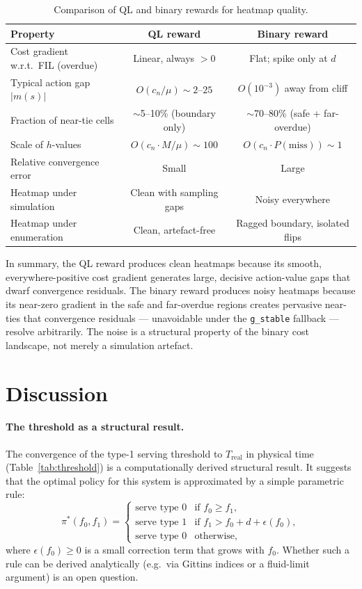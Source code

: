 \documentclass[11pt,a4paper]{article}
\begin{document}
\begin{table}[h]
\centering
\caption{Comparison of QL and binary rewards for heatmap quality.}
\label{tab:compare}
\begin{tabular}{lcc}
\toprule
Property & QL reward & Binary reward \\
\midrule
Cost gradient w.r.t.\ FIL (overdue) & Linear, always $> 0$ & Flat; spike only at $d$ \\
Typical action gap $|m(s)|$ & $O(c_n / \mu) \sim 2$--$25$ & $O(10^{-3})$ away from cliff \\
Fraction of near-tie cells & $\sim$5--10\% (boundary only) & $\sim$70--80\% (safe + far-overdue) \\
Scale of $h$-values & $O(c_n \cdot M / \mu) \sim 100$ & $O(c_n \cdot P(\text{miss})) \sim 1$ \\
Relative convergence error & Small & Large \\
Heatmap under simulation & Clean with sampling gaps & Noisy everywhere \\
Heatmap under enumeration & Clean, artefact-free & Ragged boundary, isolated flips \\
\bottomrule
\end{tabular}
\end{table}

In summary, the QL reward produces clean heatmaps because its smooth,
everywhere-positive cost gradient generates large, decisive action-value gaps
that dwarf convergence residuals.  The binary reward produces noisy heatmaps
because its near-zero gradient in the safe and far-overdue regions creates
pervasive near-ties that convergence residuals --- unavoidable under the
\texttt{g\_stable} fallback --- resolve arbitrarily.  The noise is a structural
property of the binary cost landscape, not merely a simulation artefact.


\section{Discussion}
\label{sec:discussion}

\paragraph{The threshold as a structural result.}
The convergence of the type-1 serving threshold to $T_\text{real}$ in physical
time (Table~\ref{tab:threshold}) is a computationally derived structural result.
It suggests that the optimal policy for this system is approximated by a simple
parametric rule:
\[
  \pi^*(f_0, f_1)
  = \begin{cases}
      \text{serve type 0} & \text{if } f_0 \geq f_1, \\
      \text{serve type 1} & \text{if } f_1 > f_0 + d + \epsilon(f_0), \\
      \text{serve type 0} & \text{otherwise},
    \end{cases}
\]
where $\epsilon(f_0) \geq 0$ is a small correction term that grows with $f_0$.
Whether such a rule can be derived analytically (e.g.\ via Gittins indices or a
fluid-limit argument) is an open question.
\end{document}
